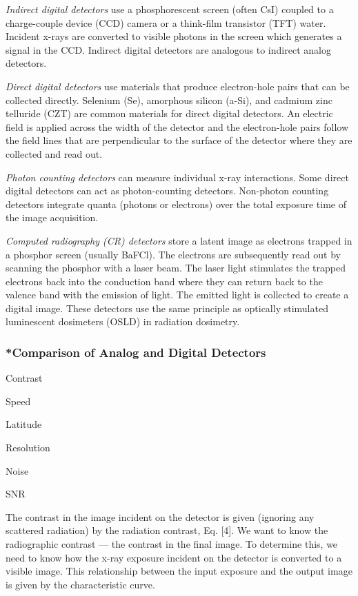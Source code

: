 \documentclass[mphy386-notes.tex]{subfiles}
\begin{document}
\textit{Indirect digital detectors} use a phosphorescent screen (often CsI)
coupled to a charge-couple device (CCD) camera or a think-film transistor (TFT)
water. Incident x-rays are converted to visible photons in the screen which
generates a signal in the CCD. Indirect digital detectors are analogous to
indirect analog detectors.

\textit{Direct digital detectors} use materials that produce electron-hole pairs
that can be collected directly. Selenium (Se), amorphous silicon (a-Si), and
cadmium zinc telluride (CZT) are common materials for direct digital detectors.
An electric field is applied across the width of the detector and the
electron-hole pairs follow the field lines that are perpendicular to the surface
of the detector where they are collected and read out.

\textit{Photon counting detectors} can measure individual x-ray interactions.
Some direct digital detectors can act as photon-counting detectors. Non-photon
counting detectors integrate quanta (photons or electrons) over the total
exposure time of the image acquisition.

\textit{Computed radiography (CR) detectors} store a latent image as electrons
trapped in a phosphor screen (usually BaFCl). The electrons are subsequently
read out by scanning the phosphor with a laser beam. The laser light stimulates
the trapped electrons back into the conduction band where they can return back
to the valence band with the emission of light. The emitted light is collected
to create a digital image. These detectors use the same principle as optically
stimulated luminescent dosimeters (OSLD) in radiation dosimetry.

\subsubsection{*Comparison of Analog and Digital Detectors} 

Contrast

Speed

Latitude

Resolution

Noise

SNR

The contrast in the image incident on the detector is given (ignoring any
scattered radiation) by the radiation contrast, Eq. [4]. We want to
know the radiographic contrast --- the contrast in the final image. To determine
this, we need to know how the x-ray exposure incident on the detector is converted
to a visible image. This relationship between the input exposure and the output
image is given by the characteristic curve.
\end{document}
